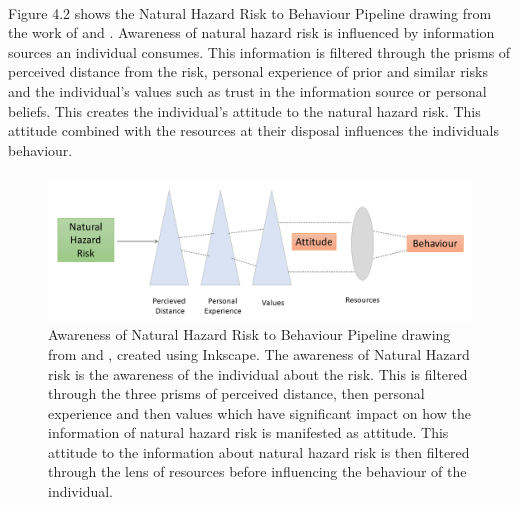 \paragraph{}
Figure 4.2 shows the Natural Hazard Risk to Behaviour Pipeline drawing from the work of \cite{whitmarsh_are_2008} and \cite{lujala_climate_2015}. Awareness of natural hazard risk is influenced by information sources an individual consumes. This information is filtered through the prisms of perceived distance from the risk, personal experience of prior and similar risks and the individual's values such as trust in the information source or personal beliefs. This creates the individual's attitude to the natural hazard risk. This attitude combined with the resources at their disposal influences the individuals behaviour.

\paragraph{}

\begin{figure}[h]
    \centering
    \includegraphics[width=1\textwidth]{fig_theory/awareness lujala and whitmarsh.png}
     \caption{Awareness of Natural Hazard Risk to Behaviour Pipeline drawing from \cite{lujala_climate_2015} and \cite{whitmarsh_are_2008}, created using Inkscape.  The awareness of Natural Hazard risk is the awareness of the individual about the risk. This is filtered through the three prisms of perceived distance, then personal experience and then values which have significant impact on how the information of natural hazard risk is manifested as attitude.  
    This attitude to the information about natural hazard risk is then filtered through the lens of resources before influencing the behaviour of the individual.} 
    \label{fig:hazard_to_behaviour}
\end{figure} 
